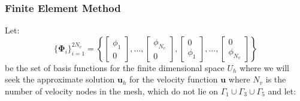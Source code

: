 \subsubsection{Finite Element Method}\label{sec:NS_Direct_Approach_FEM}
Let:
\begin{equation*}
  \{\mathbf{\Phi}_i\}^{2N_v}_{i=1} = \left\{
  \begin{bmatrix} \phi_1 \\ 0\end{bmatrix}
  , \dots ,
  \begin{bmatrix} \phi_{N_v} \\ 0\end{bmatrix}
  ,
  \begin{bmatrix} 0 \\ \phi_1\end{bmatrix}
  , \dots ,
  \begin{bmatrix} 0 \\ \phi_{N_v}\end{bmatrix}
  \right\}
\end{equation*}
be the set of basis functions for the finite dimensional space $U_h$ where we will seek the approximate solution $\mathbf{u}_h$ for the velocity function $\mathbf{u}$ where $N_v$ is the number of velocity nodes in the mesh, which do not lie on $\Gamma_1\cup\Gamma_3\cup\Gamma_5$ and let:

